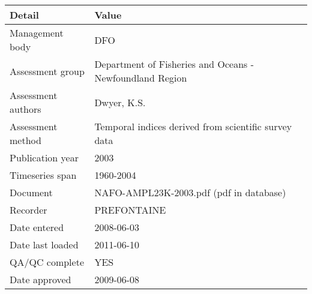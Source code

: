 \begin{table}[htb]
\centering
\begin{tabular}{lp{7cm}}
\toprule
Detail & Value \\
\midrule
Management body    & DFO                                                      \\
Assessment group   & Department of Fisheries and Oceans - Newfoundland Region \\
Assessment authors & Dwyer, K.S.                                              \\
Assessment method  & Temporal indices derived from scientific survey data     \\
Publication year   & 2003                                                     \\
Timeseries span    & 1960-2004                                                \\
Document           & NAFO-AMPL23K-2003.pdf (pdf in database)                  \\
Recorder           & PREFONTAINE                                              \\
Date entered       & 2008-06-03                                               \\
Date last loaded   & 2011-06-10                                               \\
QA/QC complete     & YES                                                      \\
Date approved      & 2009-06-08                                               \\
\bottomrule
\end{tabular}
\label{tab:assessdet}
\end{table}
